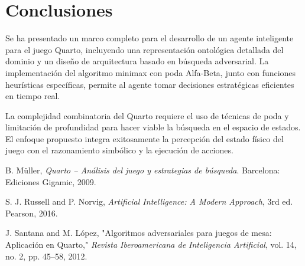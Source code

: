 \documentclass[conference]{IEEEtran}
\begin{document}
\section{Conclusiones}

Se ha presentado un marco completo para el desarrollo de un agente inteligente para el juego Quarto, incluyendo una representación ontológica detallada del dominio y un diseño de arquitectura basado en búsqueda adversarial. La implementación del algoritmo minimax con poda Alfa-Beta, junto con funciones heurísticas específicas, permite al agente tomar decisiones estratégicas eficientes en tiempo real.

La complejidad combinatoria del Quarto requiere el uso de técnicas de poda y limitación de profundidad para hacer viable la búsqueda en el espacio de estados. El enfoque propuesto integra exitosamente la percepción del estado físico del juego con el razonamiento simbólico y la ejecución de acciones.

\begin{thebibliography}{9}

B. Müller, \textit{Quarto – Análisis del juego y estrategias de búsqueda}. Barcelona: Ediciones Gigamic, 2009.

S. J. Russell and P. Norvig, \textit{Artificial Intelligence: A Modern Approach}, 3rd ed. Pearson, 2016.

J. Santana and M. López, "Algoritmos adversariales para juegos de mesa: Aplicación en Quarto," \textit{Revista Iberoamericana de Inteligencia Artificial}, vol. 14, no. 2, pp. 45–58, 2012.

\end{thebibliography}
\end{document}
